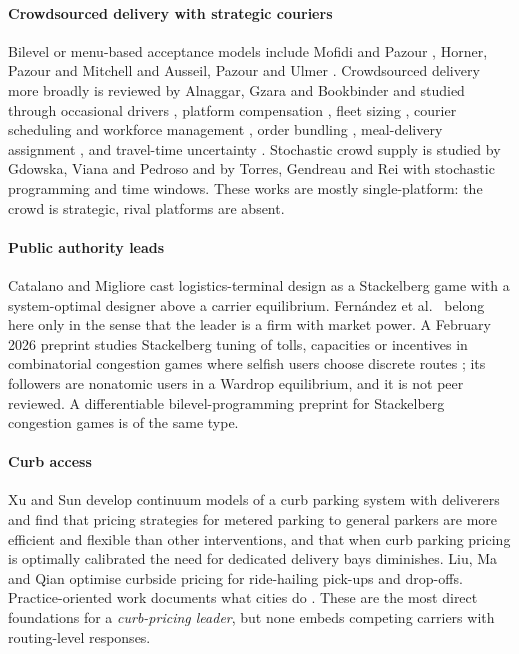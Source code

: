 \documentclass[preprint,12pt]{elsarticle}
\begin{document}
\paragraph{Crowdsourced delivery with strategic couriers} Bilevel or menu-based acceptance models include Mofidi and Pazour \cite{Mofidi2019}, Horner, Pazour and Mitchell \cite{Horner2021} and Ausseil, Pazour and Ulmer \cite{Ausseil2022}. Crowdsourced delivery more broadly is reviewed by Alnaggar, Gzara and Bookbinder \cite{Alnaggar2021} and studied through occasional drivers \cite{Archetti2016,Arslan2019,Mancini2022,Voigt2022}, platform compensation \cite{Alnaggar2024}, fleet sizing \cite{Alnaggar2026}, courier scheduling and workforce management \cite{Behrendt2023,Cheng2025}, order bundling \cite{Mancini2025}, meal-delivery assignment \cite{Cosmi2025}, and travel-time uncertainty \cite{DiPuglia2023}. Stochastic crowd supply is studied by Gdowska, Viana and Pedroso \cite{Gdowska2018} and by Torres, Gendreau and Rei \cite{Torres2022} with stochastic programming and time windows. These works are mostly single-platform: the crowd is strategic, rival platforms are absent.

\paragraph{Public authority leads} Catalano and Migliore \cite{Catalano2014} cast logistics-terminal design as a Stackelberg game with a system-optimal designer above a carrier equilibrium. Fern{\'a}ndez et al.\ \cite{Fernandez2025} belong here only in the sense that the leader is a firm with market power. A February 2026 preprint studies Stackelberg tuning of tolls, capacities or incentives in combinatorial congestion games where selfish users choose discrete routes \cite{Masiha2026}; its followers are nonatomic users in a Wardrop equilibrium, and it is not peer reviewed. A differentiable bilevel-programming preprint for Stackelberg congestion games \cite{LiPrep2022} is of the same type.

\paragraph{Curb access} Xu and Sun \cite{XuSun2024} develop continuum models of a curb parking system with deliverers and find that pricing strategies for metered parking to general parkers are more efficient and flexible than other interventions, and that when curb parking pricing is optimally calibrated the need for dedicated delivery bays diminishes. Liu, Ma and Qian \cite{LiuMaQian2023} optimise curbside pricing for ride-hailing pick-ups and drop-offs. Practice-oriented work documents what cities do \cite{Dey2019,DallaChiara2026}. These are the most direct foundations for a \emph{curb-pricing leader}, but none embeds competing carriers with routing-level responses.
\end{document}
